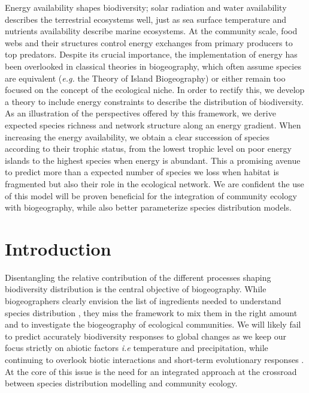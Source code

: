 Energy availability shapes biodiversity; solar radiation and water
availability describes the terrestrial ecosystems well, just as sea
surface temperature and nutrients availability describe marine
ecosystems. At the community scale, food webs and their structures
control energy exchanges from primary producers to top predators.
Despite its crucial importance, the implementation of energy has been
overlooked in classical theories in biogeography, which often assume
species are equivalent (\emph{e.g.} the Theory of Island Biogeography) or
either remain too focused on the concept of the ecological niche. In
order to rectify this, we develop a theory to include energy constraints
to describe the distribution of biodiversity. As an illustration of the
perspectives offered by this framework, we derive expected species
richness and network structure along an energy gradient. When increasing
the energy availability, we obtain a clear succession of species
according to their trophic status, from the lowest trophic level on poor
energy islands to the highest species when energy is abundant. This a
promising avenue to predict more than a expected number of species we
loss when habitat is fragmented but also their role in the ecological
network. We are confident the use of this model will be proven
beneficial for the integration of community ecology with biogeography,
while also better parameterize species distribution models.

\section{Introduction}\label{introduction}

Disentangling the relative contribution of the different processes
shaping biodiversity distribution is the central objective of
biogeography. While biogeographers clearly envision the list of
ingredients needed to understand species distribution
\citep{Thuiller2013}, they miss the framework to mix them in the right
amount and to investigate the biogeography of ecological communities. We
will likely fail to predict accurately biodiversity responses to global
changes as we keep our focus strictly on abiotic factors \emph{i.e}
temperature and precipitation, while continuing to overlook biotic
interactions \citep{Wiens2011} and short-term evolutionary responses
\citep{Lavergne2010}. At the core of this issue is the need for an
integrated approach at the crossroad between species distribution
modelling and community ecology.

